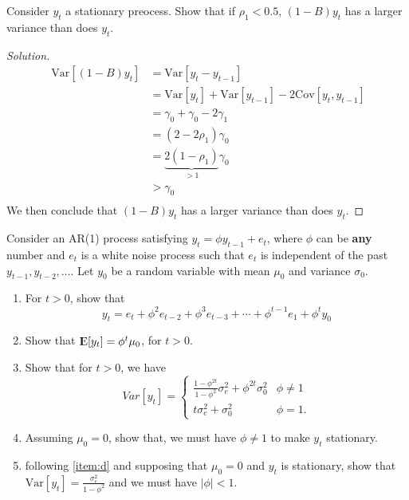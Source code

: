 \documentclass[UTF8,a4paper,14pt]{ctexart}
\newcommand{\E}{{\rm I\kern-.3em E}}
\newcommand{\Var}{\mathrm{Var}}
\newcommand{\Cov}{\mathrm{Cov}}
\newenvironment{solution}
  {\renewcommand\qedsymbol{$\blacksquare$}\begin{proof}[Solution]}
  {\end{proof}}
\theoremstyle{definition}
\theoremstyle{remark}
\begin{document}
\pagebreak
\begin{Problem}{}
  Consider \(y_t\) a stationary preocess. Show that if \(\rho_1<0.5\), \((1-B)y_{t}\) has a larger variance than does \(y_t\).
\end{Problem}
\begin{solution}
  \begin{equation}\
    \begin{aligned}
     \Var[(1-B)y_{t}] &= \Var[y_{t}-y_{t-1}]\\
     &=\Var[y_{t}]+\Var[y_{t-1}]-2\Cov[y_{t},y_{t-1}]\\
     &=\gamma_0+\gamma_0-2\gamma_1\\
     &=(2-2\rho_1)\gamma_0\\
     &=\underset{>1}{\underbrace{2(1-\rho_1)}}\gamma_0\\
     &>\gamma_0\\
    \end{aligned}
  \end{equation}
  We then conclude that \((1-B)y_{t}\) has a larger variance than does \(y_t\).
\end{solution}
\pagebreak
\begin{Problem}{}
  Consider an AR(1) process satisfying \(y_t = \phi y_{t-1}+e_t\), where \(\phi\) can be \textbf{any} number and \(e_t\) is a white noise process such that \(e_t\) is independent of the past \(y_{t-1},y_{t-2},\ldots\). Let \(y_0\) be a random variable with mean \(\mu_0\) and variance \(\sigma_0\).
  \begin{enumerate}[label=(\alph*)]
    \item For \(t>0\), show that 
    \[y_t = e_t+\phi^2 e_{t-2}+\phi^3 e_{t-3}+\cdots+\phi^{t-1} e_{1}+\phi^{t}y_0\]
    \item Show that \(\E[y_t] =\phi^t \mu_0 \), for \(t>0\).
    \item Show that for \(t>0\), we have
    \[Var[y_t] = \begin{cases}
      \frac{1-\phi^{2t}}{1-\phi^{2}}\sigma_e^2+\phi^{2t}\sigma_0^2 & \phi\neq 1\\
      t\sigma_e^2 +\sigma_0^2 & \phi= 1.
    \end{cases}\]
    \item Assuming \(\mu_0 = 0\), show that, we must have \(\phi\neq 1\) to make \(y_t\) stationary.\label{item:d}
    \item following \ref{item:d} and supposing that \(\mu_0 = 0\) and \(y_t\) is stationary, show that \(\Var[y_t] = \frac{\sigma_e^2}{1-\phi^{2}}\) and we must have \(\left\lvert \phi\right\rvert <1\).
  \end{enumerate}
\end{Problem}
\end{document}
